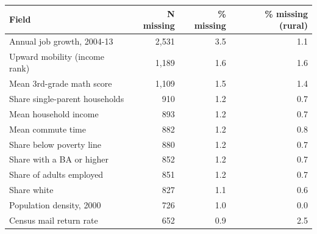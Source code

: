 \begin{tabular}{lrrr}
\toprule
Field & N missing & \% missing & \% missing (rural) \\
\midrule
Annual job growth, 2004-13 & 2,531 & 3.5 & 1.1 \\
Upward mobility (income rank) & 1,189 & 1.6 & 1.6 \\
Mean 3rd-grade math score & 1,109 & 1.5 & 1.4 \\
Share single-parent households & 910 & 1.2 & 0.7 \\
Mean household income & 893 & 1.2 & 0.7 \\
Mean commute time & 882 & 1.2 & 0.8 \\
Share below poverty line & 880 & 1.2 & 0.7 \\
Share with a BA or higher & 852 & 1.2 & 0.7 \\
Share of adults employed & 851 & 1.2 & 0.7 \\
Share white & 827 & 1.1 & 0.6 \\
Population density, 2000 & 726 & 1.0 & 0.0 \\
Census mail return rate & 652 & 0.9 & 2.5 \\
\bottomrule
\end{tabular}
